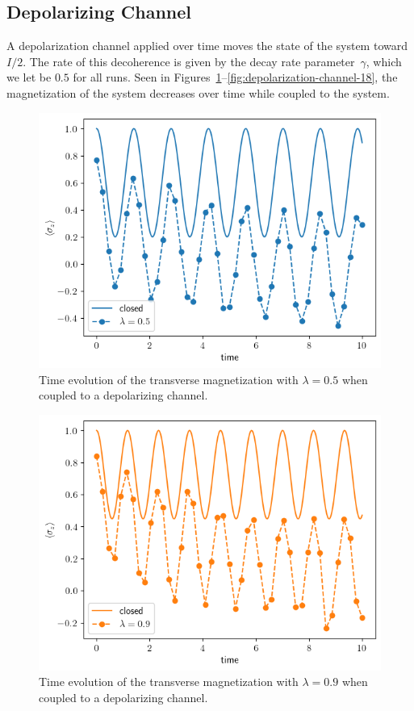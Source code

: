 \documentclass[12pt, twocolumn]{article}
\begin{document}
  \subsection{Depolarizing Channel}
  A depolarization channel applied over time moves the state of the system toward \( I / 2 \). The rate of this decoherence is given by the decay rate parameter~\( \gamma \), which we let be \( 0.5 \) for all runs. Seen in Figures~\ref{fig:depolarization-channel-05}--\ref{fig:depolarization-channel-18}, the magnetization of the system decreases over time while coupled to the system.
  \begin{figure}
    \centering
    \includegraphics[width=\linewidth]{images/depolarization_channel_05.png}
    \caption{Time evolution of the transverse magnetization with \( \lambda = 0.5 \) when coupled to a depolarizing channel.%
      \label{fig:depolarization-channel-05}}
  \end{figure}
  \begin{figure}
    \centering
    \includegraphics[width=\linewidth]{images/depolarization_channel_09.png}
    \caption{Time evolution of the transverse magnetization with \( \lambda = 0.9 \) when coupled to a depolarizing channel.%
      \label{fig:depolarization-channel-09}}
  \end{figure}
\end{document}

